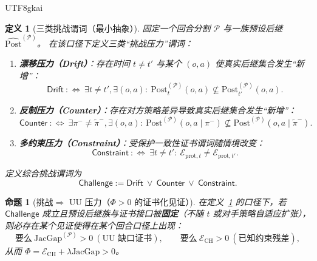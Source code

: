 \documentclass[12pt]{article}
\newtheorem{definition}{定义}[section]
\newtheorem{proposition}{命题}[section]
\newcommand{\JacGap}{\ensuremath{\mathrm{JacGap}}} %
\begin{document}
\begin{CJK*}{UTF8}{gkai}
\begin{definition}[三类挑战谓词（最小抽象）]
\label{def:challenge-three-pressures}
固定一个回合分割 $\mathcal{P}$ 与一族预设后继 $\widehat{\mathrm{Post}}^{(\mathcal{P})}$。
在该口径下定义三类“挑战压力”谓词：
\begin{enumerate}
  \item \textbf{漂移压力（Drift）}：存在时间 $t\neq t'$ 与某个 $(o,a)$ 使真实后继集合发生“新增”：
  \[
    \mathsf{Drift}
    \ :\Longleftrightarrow\
    \exists t\neq t',\exists(o,a):\ \mathrm{Post}^{(\mathcal{P})}_{t}(o,a)\not\subseteq \mathrm{Post}^{(\mathcal{P})}
      _{t'}(o,a).
  \]
  \item \textbf{反制压力（Counter）}：存在对方策略差异导致真实后继集合发生“新增”：
  \[
    \mathsf{Counter}
    \ :\Longleftrightarrow\
    \exists \pi^{-}\neq \tilde\pi^{-},\exists(o,a):\ \mathrm{Post}^{(\mathcal{P})}(o,a\mid \pi^{-})\not\subseteq
      \mathrm{Post}^{(\mathcal{P})}(o,a\mid \tilde\pi^{-}).
  \]
  \item \textbf{多约束压力（Constraint）}：受保护一致性证书谓词随情境改变：
  \[
    \mathsf{Constraint}
    \ :\Longleftrightarrow\
    \exists t\neq t':\ \mathcal{E}_{\mathrm{prot},t}\neq \mathcal{E}_{\mathrm{prot},t'}.
  \]
\end{enumerate}
定义综合挑战谓词为
\[
  \mathsf{Challenge}:=\mathsf{Drift}\ \vee\ \mathsf{Counter}\ \vee\ \mathsf{Constraint}.
\]
\end{definition}

\begin{proposition}[挑战$\Rightarrow$ UU 压力（$\Phi>0$ 的证书化见证）]
\label{prop:challenge-implies-phi-pressure}
在定义~\ref{def:challenge-three-pressures} 的口径下，若 $\mathsf{Challenge}$ 成立且预设后继族与证书接口被\textbf{固定}（不随 $t$ 或对手策略自适应扩张），
则必存在某个见证使得在某个回合口径上出现：
\[
  \text{要么}\ \JacGap^{(\mathcal{P})}>0\ (\text{UU 缺口证书}),\qquad
  \text{要么}\ \mathcal{E}_{\mathrm{CH}}>0\ (\text{已知约束残差}),
\]
从而 $\Phi=\mathcal{E}_{\mathrm{CH}}+\lambda\JacGap>0$。
\end{proposition}


\end{CJK*}
\end{document}
